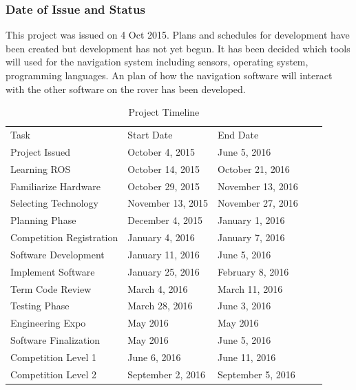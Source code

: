 \documentclass[10pt, oneside,onecolumn]{IEEEtran}
\begin{document}
\begin{titlepage}
\subsubsection{Date of Issue and Status}

This project was issued on 4 Oct 2015. Plans and schedules for development have been created but development has not yet begun. It has been decided which tools will used for the navigation system including sensors, operating system, programming languages. An plan of how the navigation software will interact with the other software on the rover has been developed. 


\begin{table}[H]
\centering
\caption{Project Timeline}
\begin{tabular}{lllll}
Task               & Start Date     & End Date                         &  &  \\
Project Issued & October 4, 2015  & June 5, 2016 &  &  \\
Learning ROS & October 14, 2015 & October 21, 2016 &  &  \\
Familiarize Hardware & October 29, 2015 & November 13, 2016 &  &  \\
Selecting Technology & November 13, 2015 & November 27, 2016 &  &  \\
Planning Phase & December 4, 2015 & January 1, 2016 &  &  \\
Competition Registration & January 4, 2016 & January 7, 2016 &  &  \\
Software Development & January 11, 2016 & June 5, 2016 &  &  \\
Implement Software & January 25, 2016 & February 8, 2016 &  &  \\
Term Code Review & March 4, 2016 & March 11, 2016 &  &  \\
Testing Phase & March 28, 2016 & June 3, 2016 &  &  \\
Engineering Expo & May 2016 & May 2016 &  &  \\
Software Finalization  & May 2016 & June 5, 2016 &  &  \\
Competition Level 1 & June 6, 2016 & June 11, 2016 &  & \\
Competition Level 2 & September 2, 2016 & September 5, 2016 &  &  \\
\end{tabular}
\end{table}


\end{titlepage}
\end{document}
